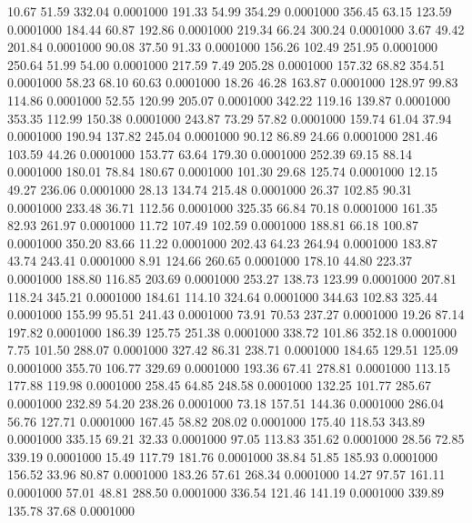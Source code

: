   10.67   51.59  332.04   0.0001000
 191.33   54.99  354.29   0.0001000
 356.45   63.15  123.59   0.0001000
 184.44   60.87  192.86   0.0001000
 219.34   66.24  300.24   0.0001000
   3.67   49.42  201.84   0.0001000
  90.08   37.50   91.33   0.0001000
 156.26  102.49  251.95   0.0001000
 250.64   51.99   54.00   0.0001000
 217.59    7.49  205.28   0.0001000
 157.32   68.82  354.51   0.0001000
  58.23   68.10   60.63   0.0001000
  18.26   46.28  163.87   0.0001000
 128.97   99.83  114.86   0.0001000
  52.55  120.99  205.07   0.0001000
 342.22  119.16  139.87   0.0001000
 353.35  112.99  150.38   0.0001000
 243.87   73.29   57.82   0.0001000
 159.74   61.04   37.94   0.0001000
 190.94  137.82  245.04   0.0001000
  90.12   86.89   24.66   0.0001000
 281.46  103.59   44.26   0.0001000
 153.77   63.64  179.30   0.0001000
 252.39   69.15   88.14   0.0001000
 180.01   78.84  180.67   0.0001000
 101.30   29.68  125.74   0.0001000
  12.15   49.27  236.06   0.0001000
  28.13  134.74  215.48   0.0001000
  26.37  102.85   90.31   0.0001000
 233.48   36.71  112.56   0.0001000
 325.35   66.84   70.18   0.0001000
 161.35   82.93  261.97   0.0001000
  11.72  107.49  102.59   0.0001000
 188.81   66.18  100.87   0.0001000
 350.20   83.66   11.22   0.0001000
 202.43   64.23  264.94   0.0001000
 183.87   43.74  243.41   0.0001000
   8.91  124.66  260.65   0.0001000
 178.10   44.80  223.37   0.0001000
 188.80  116.85  203.69   0.0001000
 253.27  138.73  123.99   0.0001000
 207.81  118.24  345.21   0.0001000
 184.61  114.10  324.64   0.0001000
 344.63  102.83  325.44   0.0001000
 155.99   95.51  241.43   0.0001000
  73.91   70.53  237.27   0.0001000
  19.26   87.14  197.82   0.0001000
 186.39  125.75  251.38   0.0001000
 338.72  101.86  352.18   0.0001000
   7.75  101.50  288.07   0.0001000
 327.42   86.31  238.71   0.0001000
 184.65  129.51  125.09   0.0001000
 355.70  106.77  329.69   0.0001000
 193.36   67.41  278.81   0.0001000
 113.15  177.88  119.98   0.0001000
 258.45   64.85  248.58   0.0001000
 132.25  101.77  285.67   0.0001000
 232.89   54.20  238.26   0.0001000
  73.18  157.51  144.36   0.0001000
 286.04   56.76  127.71   0.0001000
 167.45   58.82  208.02   0.0001000
 175.40  118.53  343.89   0.0001000
 335.15   69.21   32.33   0.0001000
  97.05  113.83  351.62   0.0001000
  28.56   72.85  339.19   0.0001000
  15.49  117.79  181.76   0.0001000
  38.84   51.85  185.93   0.0001000
 156.52   33.96   80.87   0.0001000
 183.26   57.61  268.34   0.0001000
  14.27   97.57  161.11   0.0001000
  57.01   48.81  288.50   0.0001000
 336.54  121.46  141.19   0.0001000
 339.89  135.78   37.68   0.0001000
